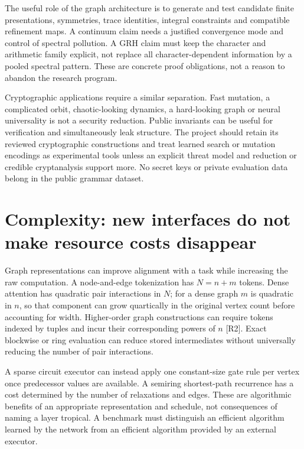 The useful role of the graph architecture is to generate and test candidate finite presentations, symmetries, trace identities, integral constraints and compatible refinement maps. A continuum claim needs a justified convergence mode and control of spectral pollution. A GRH claim must keep the character and arithmetic family explicit, not replace all character-dependent information by a pooled spectral pattern. These are concrete proof obligations, not a reason to abandon the research program.

Cryptographic applications require a similar separation. Fast mutation, a complicated orbit, chaotic-looking dynamics, a hard-looking graph or neural universality is not a security reduction. Public invariants can be useful for verification and simultaneously leak structure. The project should retain its reviewed cryptographic constructions and treat learned search or mutation encodings as experimental tools unless an explicit threat model and reduction or credible cryptanalysis support more. No secret keys or private evaluation data belong in the public grammar dataset.

\section{Complexity: new interfaces do not make resource costs disappear}
\label{sec:wb-language-complexity}

Graph representations can improve alignment with a task while increasing the raw computation. A node-and-edge tokenization has $N=n+m$ tokens. Dense attention has quadratic pair interactions in $N$; for a dense graph $m$ is quadratic in $n$, so that component can grow quartically in the original vertex count before accounting for width. Higher-order graph constructions can require tokens indexed by tuples and incur their corresponding powers of $n$ [R2]. Exact blockwise or ring evaluation can reduce stored intermediates without universally reducing the number of pair interactions.

A sparse circuit executor can instead apply one constant-size gate rule per vertex once predecessor values are available. A semiring shortest-path recurrence has a cost determined by the number of relaxations and edges. These are algorithmic benefits of an appropriate representation and schedule, not consequences of naming a layer tropical. A benchmark must distinguish an efficient algorithm learned by the network from an efficient algorithm provided by an external executor.

